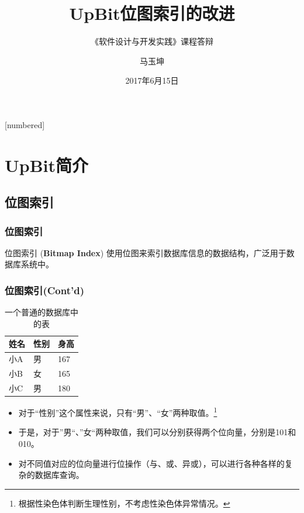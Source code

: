 \documentclass[hyperref={unicode=true}]{beamer}
\begin{document}
[numbered]
\renewcommand\figurename{图}
\renewcommand\tablename{表}
\renewcommand\contentsname{\centering 目录}

\title{UpBit位图索引的改进}
\subtitle{《软件设计与开发实践》课程答辩}
\author{马玉坤}
\date{2017年6月15日}

\begin{frame}
  \titlepage
\end{frame}

\begin{frame}
  \tableofcontents
\end{frame}


\section{UpBit简介}
\subsection{位图索引}
\begin{frame}\frametitle{位图索引}
  \begin{block}{位图索引 ({\bf Bitmap Index})}
    使用位图来索引数据库信息的数据结构，广泛用于数据库系统中。
  \end{block}
\end{frame}

\begin{frame}\frametitle{位图索引(Cont'd)}
  \begin{table}[H]
    \centering
    \begin{tabular}{|l|l|l|}
      \hline
      姓名 & 性别 & 身高 \\ \hline
      小A & 男   & 167   \\ \hline
      小B & 女   & 165   \\ \hline
      小C & 男   & 180 \\ \hline
    \end{tabular}
    \label{tb:table} \caption{一个普通的数据库中的表}
  \end{table}
  \begin{itemize}[<+->]
  \item 对于“性别”这个属性来说，只有“男”、“女”两种取值。\footnote{根据性染色体判断生理性别，不考虑性染色体异常情况。}\\
  \item 于是，对于”男“、”女“两种取值，我们可以分别获得两个位向量，分别是101和010。\\
  \item 对不同值对应的位向量进行位操作（与、或、异或），可以进行各种各样的复杂的数据库查询。
  \end{itemize}
\end{frame}
\end{document}
